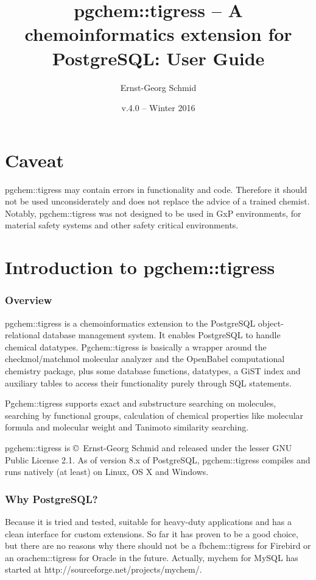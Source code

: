 \documentclass[a4paper]{article}
\begin{document}
\title{pgchem::tigress -- A chemoinformatics extension for PostgreSQL: User Guide}
\author{Ernst-Georg Schmid}
\date{v.4.0	-- Winter 2016}
\maketitle%
\newpage
\tableofcontents\newpage
\part{Caveat}
pgchem::tigress may contain errors in functionality and code. Therefore it should not be used unconsiderately and does not replace the advice of a trained chemist.
Notably, pgchem::tigress was not designed to be used in GxP environments, for material safety systems and other safety critical environments.
\part{Introduction to pgchem::tigress}
\section{Overview}
pgchem::tigress is a chemoinformatics extension to the PostgreSQL object-relational database management system. It enables PostgreSQL to handle chemical datatypes. Pgchem::tigress is basically a wrapper around the checkmol/matchmol molecular analyzer and the OpenBabel computational chemistry package, plus some database functions, datatypes, a GiST index and auxiliary tables to access their functionality purely through SQL statements.\par
Pgchem::tigress supports exact and substructure searching on molecules, searching by functional groups, calculation of chemical properties like molecular formula and molecular weight and Tanimoto similarity searching.\par
pgchem::tigress is \copyright~Ernst-Georg Schmid and released under the lesser GNU Public License 2.1.
As of version 8.x of PostgreSQL, pgchem::tigress compiles and runs natively (at least) on Linux, OS X and Windows. 
\section{Why PostgreSQL?}
Because it is tried and tested, suitable for heavy-duty applications and has a clean interface for custom extensions. So far it has proven to be a good choice, but there are no reasons why there should not be a fbchem::tigress for Firebird or an orachem::tigress for Oracle in the future. Actually, mychem for MySQL has started at http://sourceforge.net/projects/mychem/.
\end{document}
